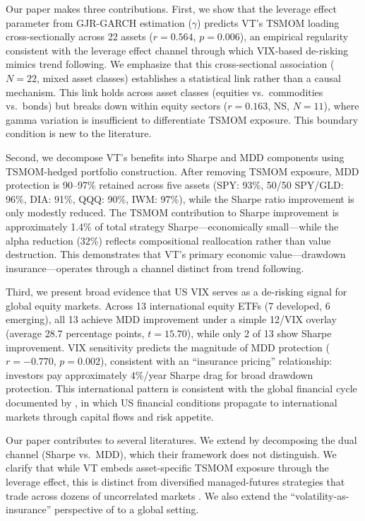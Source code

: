 \documentclass[12pt,a4paper]{article}
\begin{document}
Our paper makes three contributions. First, we show that the leverage effect parameter from GJR-GARCH estimation ($\gamma$) predicts VT's TSMOM loading cross-sectionally across 22 assets ($r = 0.564$, $p = 0.006$), an empirical regularity consistent with the leverage effect channel through which VIX-based de-risking mimics trend following. We emphasize that this cross-sectional association ($N = 22$, mixed asset classes) establishes a statistical link rather than a causal mechanism. This link holds across asset classes (equities vs.\ commodities vs.\ bonds) but breaks down within equity sectors ($r = 0.163$, NS, $N = 11$), where gamma variation is insufficient to differentiate TSMOM exposure. This boundary condition is new to the literature.

Second, we decompose VT's benefits into Sharpe and MDD components using TSMOM-hedged portfolio construction. After removing TSMOM exposure, MDD protection is 90--97\% retained across five assets (SPY: 93\%, 50/50 SPY/GLD: 96\%, DIA: 91\%, QQQ: 90\%, IWM: 97\%), while the Sharpe ratio improvement is only modestly reduced. The TSMOM contribution to Sharpe improvement is approximately 1.4\% of total strategy Sharpe---economically small---while the alpha reduction (32\%) reflects compositional reallocation rather than value destruction. This demonstrates that VT's primary economic value---drawdown insurance---operates through a channel distinct from trend following.

Third, we present broad evidence that US VIX serves as a de-risking signal for global equity markets. Across 13 international equity ETFs (7 developed, 6 emerging), all 13 achieve MDD improvement under a simple 12/VIX overlay (average 28.7 percentage points, $t = 15.70$), while only 2 of 13 show Sharpe improvement. VIX sensitivity predicts the magnitude of MDD protection ($r = -0.770$, $p = 0.002$), consistent with an ``insurance pricing'' relationship: investors pay approximately $4\%$/year Sharpe drag for broad drawdown protection. This international pattern is consistent with the global financial cycle documented by \citet{miranda2020}, in which US financial conditions propagate to international markets through capital flows and risk appetite.

Our paper contributes to several literatures. We extend \citet{hood2025} by decomposing the dual channel (Sharpe vs.\ MDD), which their framework does not distinguish. We clarify that while VT embeds asset-specific TSMOM exposure through the leverage effect, this is distinct from diversified managed-futures strategies that trade across dozens of uncorrelated markets \citep{moskowitz2012, baltas2013}. We also extend the ``volatility-as-insurance'' perspective of \citet{lai2026a} to a global setting.
\end{document}
